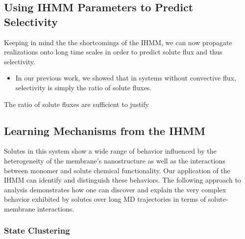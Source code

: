 \documentclass[journal=jpcbfk,manuscript=article]{achemso}
\begin{document}
  
  \subsection{Using IHMM Parameters to Predict Selectivity}\label{section:macroscopic_properties}
  
  
  Keeping in mind the the shortcomings of the IHMM, we can now propagate realizations onto long 
  time scales in order to predict solute flux and thus selectivity. 
  \begin{itemize}
    \item In our previous work, we showed that in systems without convective flux, selectivity is
    simply the ratio of solute fluxes.
  \end{itemize}
  
  The ratio of solute fluxes are sufficient to justify
  
  \subsection{Learning Mechanisms from the IHMM}\label{section:mechanisms}
  
  Solutes in this system show a wide range of behavior influenced by the 
  heterogeneity of the membrane's nanostructure as well as the interactions 
  between monomer and solute chemical functionality. Our application of the 
  IHMM can identify and distinguish these behaviors. The following approach 
  to analysis demonstrates how one can discover and explain the very complex
  behavior exhibited by solutes over long MD trajectories in terms of 
  solute-membrane interactions.
  
  \subsubsection*{State Clustering}
  
\end{document}
